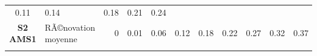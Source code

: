 \documentclass[]{article}
\begin{document}
\begin{longtable}[]{@{}clrrrrrrrrr@{}}
\begin{minipage}[t]{0.05\columnwidth}
0.11\strut
\end{minipage} & \begin{minipage}[t]{0.05\columnwidth}\raggedleft\strut
0.14\strut
\end{minipage} & \begin{minipage}[t]{0.05\columnwidth}\raggedleft\strut
0.18\strut
\end{minipage} & \begin{minipage}[t]{0.05\columnwidth}\raggedleft\strut
0.21\strut
\end{minipage} & \begin{minipage}[t]{0.05\columnwidth}\raggedleft\strut
0.24\strut
\end{minipage}\tabularnewline
\begin{minipage}[t]{0.12\columnwidth}\centering\strut
\textbf{S2 AMS1}\strut
\end{minipage} & \begin{minipage}[t]{0.17\columnwidth}\raggedright\strut
RÃ©novation moyenne\strut
\end{minipage} & \begin{minipage}[t]{0.05\columnwidth}\raggedleft\strut
0\strut
\end{minipage} & \begin{minipage}[t]{0.05\columnwidth}\raggedleft\strut
0.01\strut
\end{minipage} & \begin{minipage}[t]{0.05\columnwidth}\raggedleft\strut
0.06\strut
\end{minipage} & \begin{minipage}[t]{0.05\columnwidth}\raggedleft\strut
0.12\strut
\end{minipage} & \begin{minipage}[t]{0.05\columnwidth}\raggedleft\strut
0.18\strut
\end{minipage} & \begin{minipage}[t]{0.05\columnwidth}\raggedleft\strut
0.22\strut
\end{minipage} & \begin{minipage}[t]{0.05\columnwidth}\raggedleft\strut
0.27\strut
\end{minipage} & \begin{minipage}[t]{0.05\columnwidth}\raggedleft\strut
0.32\strut
\end{minipage} & \begin{minipage}[t]{0.05\columnwidth}\raggedleft\strut
0.37\strut
\end{minipage}\tabularnewline
\begin{minipage}[t]{0.12\columnwidth}\centering\strut

\end{minipage}
\end{longtable}
\end{document}
